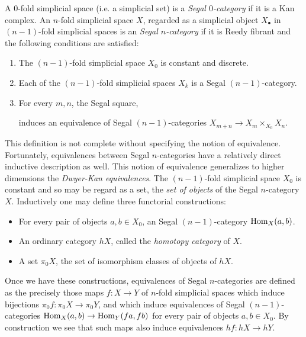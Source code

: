 \documentclass{amsart}
\begin{document}
\begin{definition}
	A $0$-fold simplicial space (i.e. a simplicial set) is a {\em  Segal $0$-category} if it is a Kan complex. An $n$-fold simplicial space $X$, regarded as a simplicial object $X_\bullet$ in $(n-1)$-fold simplicial spaces is an {\em Segal $n$-category} if it is Reedy fibrant and the following conditions are satisfied:
		\begin{enumerate}
			\item The $(n-1)$-fold simplicial space $X_0$ is constant and discrete.
			\item Each of the $(n-1)$-fold simplicial spaces $X_k$ is a  Segal $(n-1)$-category.
			\item For every $m, n$, the Segal square,
			\begin{center}
			\end{center}
			induces an equivalence of  Segal $(n-1)$-categories $X_{m+n} \to X_m \times_{X_0} X_n$.  
				\end{enumerate}
\end{definition}

\noindent This definition is not complete without specifying the notion of equivalence. Fortunately, equivalences between Segal $n$-categories have a relatively direct inductive description as well. This notion of equivalence generalizes to higher dimensions the {\em Dwyer-Kan equivalences}. The $(n-1)$-fold simplicial space $X_0$ is constant and so may be regard as a set, the {\em set of objects} of the Segal $n$-category $X$. 
Inductively one may define three functorial constructions:
\begin{itemize}
	\item For every pair of objects $a,b \in X_0$, an Segal $(n-1)$-category $\operatorname{Hom}_X(a,b)$.
	\item An ordinary category $\mathit{h}X$, called the {\em homotopy category} of $X$.
	\item A set $\pi_0 X$, the set of isomorphism classes of objects of $\mathit{h}X$. 
\end{itemize}
Once we have these constructions, equivalences of Segal $n$-categories are defined as the precisely those maps $f:X \to Y$ of $n$-fold simplicial spaces which induce bijections $\pi_0 f: \pi_0 X \to \pi_0 Y$, 
and which induce equivalences of Segal $(n-1)$-categories $\operatorname{Hom}_X(a,b) \to \operatorname{Hom}_Y(fa, fb)$ for every pair of objects $a,b \in X_0$. By construction we see that such maps also induce equivalences $\mathit{h}f:\mathit{h}X \to \mathit{h}Y$.
\end{document}
